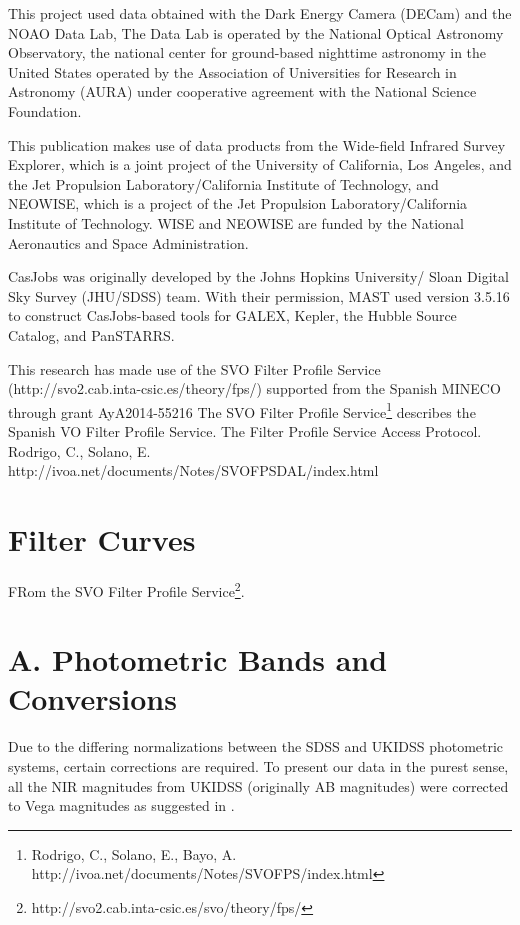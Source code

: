 \documentclass[usenatbib]{mnras}
\begin{document}
This project used data obtained with the Dark Energy Camera (DECam)
and the NOAO Data Lab, The Data Lab is operated by the National
Optical Astronomy Observatory, the national center for ground-based
nighttime astronomy in the United States operated by the Association
of Universities for Research in Astronomy (AURA) under cooperative
agreement with the National Science Foundation.

This publication makes use of data products from the Wide-field
Infrared Survey Explorer, which is a joint project of the University
of California, Los Angeles, and the Jet Propulsion
Laboratory/California Institute of Technology, and NEOWISE, which is a
project of the Jet Propulsion Laboratory/California Institute of
Technology. WISE and NEOWISE are funded by the National Aeronautics
and Space Administration.

CasJobs was originally developed by the Johns Hopkins University/
Sloan Digital Sky Survey (JHU/SDSS) team. With their permission, MAST
used version 3.5.16 to construct CasJobs-based tools for GALEX,
Kepler, the Hubble Source Catalog, and PanSTARRS.

This research has made use of the SVO Filter Profile Service
(http://svo2.cab.inta-csic.es/theory/fps/) supported from the Spanish
MINECO through grant AyA2014-55216 
The SVO Filter Profile Service\footnote{Rodrigo, C., Solano, E., Bayo, A. http://ivoa.net/documents/Notes/SVOFPS/index.html}
describes the Spanish VO Filter Profile Service. 
The Filter Profile Service Access Protocol. Rodrigo, C., Solano, E. http://ivoa.net/documents/Notes/SVOFPSDAL/index.html

\newpage

\appendix
\section{Filter Curves}\label{sec:filters} 
FRom the SVO Filter Profile Service\footnote{http://svo2.cab.inta-csic.es/svo/theory/fps/}.

\section{A. Photometric Bands and Conversions}
    Due to the differing normalizations between the
    SDSS and  UKIDSS photometric systems, certain corrections are required.  To present
    our data in the  purest sense, all the NIR magnitudes from UKIDSS
    (originally AB magnitudes)  were corrected to Vega magnitudes as
    suggested in \citet{Hewett2006}.
    
\end{document}
